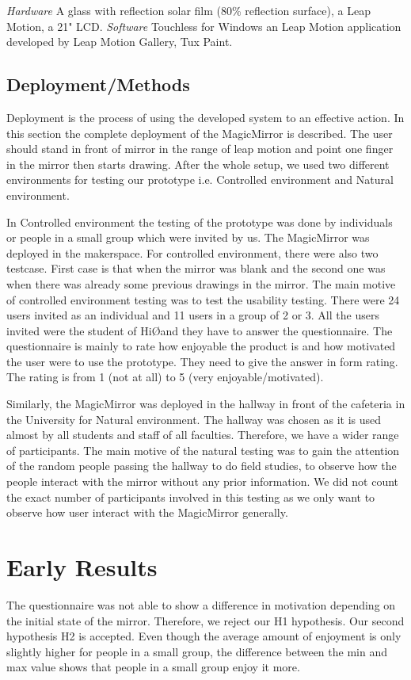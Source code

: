 \documentclass{sigchi-ext}
\begin{document}
\textit{Hardware}
A glass with reflection solar film (80\% reflection surface), a Leap Motion, a 21" LCD.
\textit{Software}
Touchless for Windows an Leap Motion application developed by Leap Motion Gallery, Tux Paint.


\subsection{Deployment/Methods}
Deployment is the process of using the developed system to an effective action. In this section the complete deployment of the MagicMirror is described.
The user should stand in front of mirror in the range of leap motion and point one finger in the mirror then starts drawing.
After the whole setup, we used two different environments for testing our prototype i.e. Controlled environment and Natural environment.

In Controlled environment the testing of the prototype was done by individuals or people in a small group which were invited by us. The MagicMirror was deployed in the makerspace. For controlled environment, there were also two testcase. First case is that when the mirror was blank and the second one was when there was already some previous drawings in the mirror. The main motive of controlled environment testing was to test the usability testing. There were 24 users invited as an individual and 11 users in a group of 2 or 3. All the users invited were the student of Hi\O  and they have to answer the questionnaire. The questionnaire is mainly to rate how enjoyable the product is and how motivated the user were to use the prototype. They need to give the answer in form rating. The rating is from 1 (not at all) to 5 (very enjoyable/motivated).
 
Similarly, the MagicMirror was deployed in the hallway in front of the cafeteria in the University for Natural environment. The hallway was chosen as it is used almost by all students and staff of all faculties. Therefore, we have a wider range of participants. The main motive of the natural testing was to gain the attention of the random people passing the hallway to do field studies, to observe how the people interact with the mirror without any prior information. We did not count the exact number of participants involved in this testing as we only want to observe how user interact with the MagicMirror generally.

\section{Early Results}
The questionnaire was not able to show a difference in motivation depending on the initial state of the mirror. Therefore, we reject our H1 hypothesis. Our second hypothesis H2 is accepted. Even though the average amount of enjoyment is only slightly higher for people in a small group, the difference between the min and max value shows that people in a small group enjoy it more.
\end{document}
